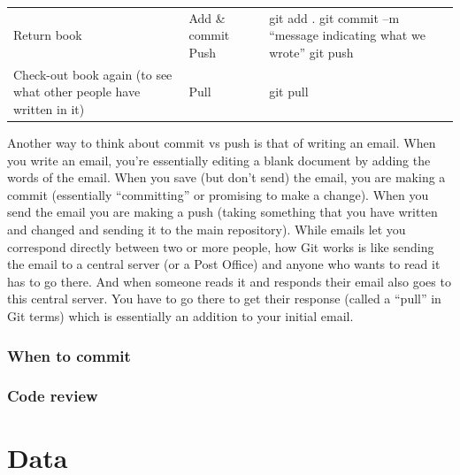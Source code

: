 \documentclass[
  12pt,
]{book}
\begin{document}
\begin{longtable}[]{@{}lll@{}}
\begin{minipage}[t]{0.30\columnwidth}
Return book\strut
\end{minipage} & \begin{minipage}[t]{0.30\columnwidth}\raggedright
Add \& commit Push\strut
\end{minipage} & \begin{minipage}[t]{0.30\columnwidth}\raggedright
git add . git commit --m ``message indicating what we wrote'' git push\strut
\end{minipage}\tabularnewline
\begin{minipage}[t]{0.30\columnwidth}\raggedright
Check-out book again (to see what other people have written in it)\strut
\end{minipage} & \begin{minipage}[t]{0.30\columnwidth}\raggedright
Pull\strut
\end{minipage} & \begin{minipage}[t]{0.30\columnwidth}\raggedright
git pull\strut
\end{minipage}\tabularnewline
\bottomrule
\end{longtable}

Another way to think about commit vs push is that of writing an email. When you write an email, you're essentially editing a blank document by adding the words of the email. When you save (but don't send) the email, you are making a commit (essentially ``committing'' or promising to make a change). When you send the email you are making a push (taking something that you have written and changed and sending it to the main repository). While emails let you correspond directly between two or more people, how Git works is like sending the email to a central server (or a Post Office) and anyone who wants to read it has to go there. And when someone reads it and responds their email also goes to this central server. You have to go there to get their response (called a ``pull'' in Git terms) which is essentially an addition to your initial email.

\hypertarget{when-to-commit}{%
\section{When to commit}\label{when-to-commit}}

\hypertarget{code-review}{%
\section{Code review}\label{code-review}}

\hypertarget{part-data}{%
\part{Data}\label{part-data}}
\end{document}
